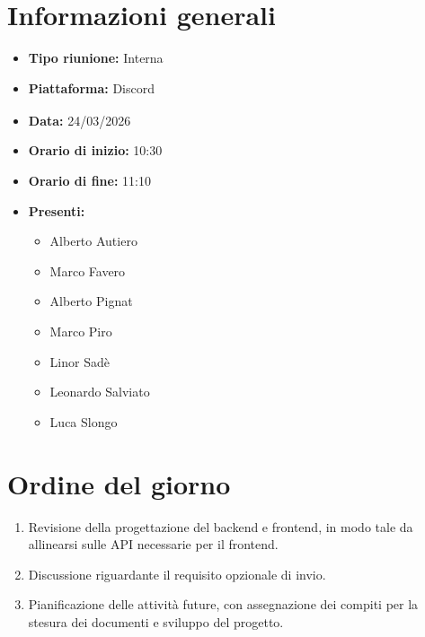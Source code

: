 \documentclass[a4paper,12pt]{article}
\begin{document}
\newpage

\tableofcontents
\newpage

\section{Informazioni generali}

\begin{itemize}
    \item \textbf{Tipo riunione:} Interna
    \item \textbf{Piattaforma:} Discord\textsubscript{}
    \item \textbf{Data:} 24/03/2026
    \item \textbf{Orario di inizio:} 10:30
    \item \textbf{Orario di fine:} 11:10
    \item \textbf{Presenti:}
    \begin{itemize}[leftmargin=1.5em, itemsep=3pt, label={\rule[0.5ex]{0.4em}{0.4em}}]
        \item Alberto Autiero
        \item Marco Favero
        \item Alberto Pignat
        \item Marco Piro
        \item Linor Sadè
        \item Leonardo Salviato
        \item Luca Slongo
    \end{itemize}
\end{itemize}

\section{Ordine del giorno}
\begin{enumerate}
    \item\label{itm:revisione_progettazione} Revisione della progettazione del backend e frontend, in modo tale da allinearsi sulle API necessarie per il frontend.
    \item\label{itm:discussione_requisiti} Discussione riguardante il requisito opzionale di invio.
    \item \label{itm:decisioni_future} Pianificazione delle attività future, con assegnazione dei compiti per la stesura dei documenti e sviluppo del progetto\textsubscript{}.
\end{enumerate}
\end{document}
